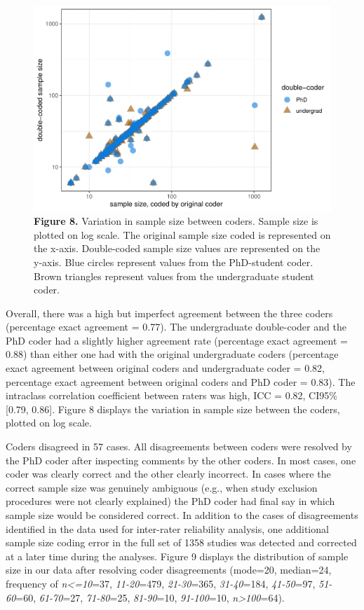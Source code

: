 \documentclass[
  man,floatsintext]{apa6}
\begin{document}
\begin{figure}
\centering
\includegraphics{RVcn_feasibility_in_social_neuroscience_files/figure-latex/fig8-1.pdf}
\caption{\label{fig:fig8}\textbf{Figure 8.} Variation in sample size between coders. Sample size is plotted on log scale. The original sample size coded is represented on the x-axis. Double-coded sample size values are represented on the y-axis. Blue circles represent values from the PhD-student coder. Brown triangles represent values from the undergraduate student coder.}
\end{figure}

Overall, there was a high but imperfect agreement between the three coders (percentage exact agreement = 0.77). The undergraduate double-coder and the PhD coder had a slightly higher agreement rate (percentage exact agreement = 0.88) than either one had with the original undergraduate coders (percentage exact agreement between original coders and undergraduate coder = 0.82, percentage exact agreement between original coders and PhD coder = 0.83). The intraclass correlation coefficient between raters was high, ICC = 0.82, CI95\%{[}0.79, 0.86{]}. Figure 8 displays the variation in sample size between the coders, plotted on log scale.

Coders disagreed in 57 cases. All disagreements between coders were resolved by the PhD coder after inspecting comments by the other coders. In most cases, one coder was clearly correct and the other clearly incorrect. In cases where the correct sample size was genuinely ambiguous (e.g., when study exclusion procedures were not clearly explained) the PhD coder had final say in which sample size would be considered correct. In addition to the cases of disagreements identified in the data used for inter-rater reliability analysis, one additional sample size coding error in the full set of 1358 studies was detected and corrected at a later time during the analyses. Figure 9 displays the distribution of sample size in our data after resolving coder disagreements (mode=20, median=24, frequency of \emph{n\textless=10}=37, \emph{11-20}=479, \emph{21-30}=365, \emph{31-40}=184, \emph{41-50}=97, \emph{51-60}=60, \emph{61-70}=27, \emph{71-80}=25, \emph{81-90}=10, \emph{91-100}=10, \emph{n\textgreater100}=64).
\end{document}
